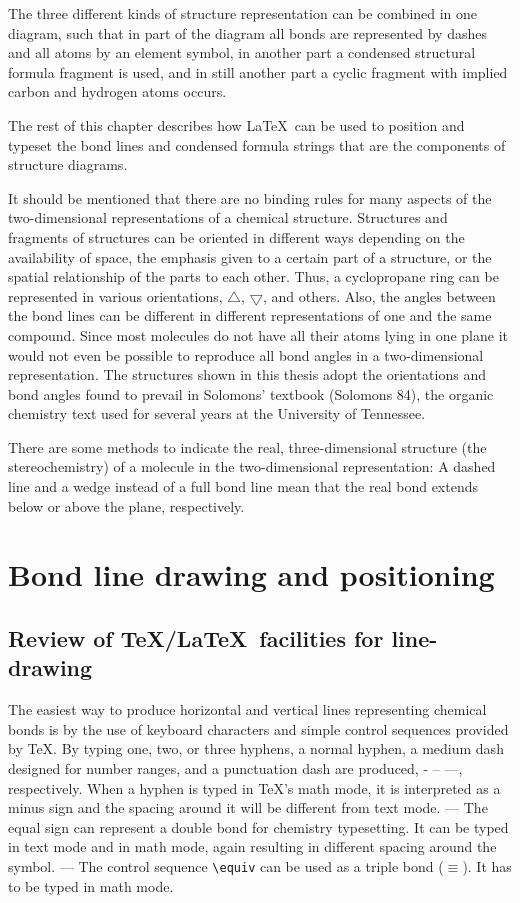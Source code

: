  \reinit
 The three different kinds of structure representation can
 be combined in one diagram, such that in part of the
 diagram all bonds are represented by dashes and all
 atoms by an element symbol, in another part a condensed
 structural formula fragment is used, and in still
 another part a cyclic fragment with implied carbon
 and hydrogen atoms occurs.
 
 The rest of this chapter describes how \LaTeX\  can be used
 to position and typeset the bond lines and condensed
 formula strings that are the components of structure
 diagrams.
 
 It should be mentioned that there are no binding rules
 for many aspects of the two-dimensional representations
 of a chemical structure. Structures and fragments of
 structures can be oriented in different ways depending
 on the availability of space, the emphasis given to
 a certain part of a structure, or the spatial
 relationship of the parts to each other.
 Thus, a cyclopropane ring can be represented in various
 orientations, $\bigtriangleup $, $\bigtriangledown $,
 and others. Also, the angles between
 the bond lines can be different in different representations
 of one and the same compound. Since most molecules do not
 have all their atoms lying in one plane it would not
 even be possible to reproduce all bond angles in a
 two-dimensional representation. The structures shown in
 this thesis adopt the orientations and bond angles
 found to prevail in Solomons' textbook (Solomons 84),
 the organic chemistry text used for several years at
 the University of Tennessee.
 
 There are some methods to indicate the real,
 three-dimensional structure (the stereochemistry)
 of a molecule in the two-dimensional representation:
 A dashed line and a wedge instead of a full bond
 line mean that the real bond extends below or
 above the plane, respectively.
 
\section{Bond line drawing and positioning}
\subsection{Review of \TeX/\LaTeX\  facilities for line-drawing}
\label{sc:review}
 The easiest way to produce horizontal and vertical lines representing
 chemical bonds is by the use of keyboard characters and simple control
 sequences provided by \TeX.  By typing one, two, or three hyphens,
 a normal hyphen, a medium dash designed for number ranges, and a
 punctuation dash are produced, - -- ---, respectively. When a hyphen
 is typed in \TeX's math mode, it is interpreted as a minus sign and
 the spacing around it will be different from text mode. ---
 The equal sign can represent a double bond for chemistry typesetting.
 It can be typed in text mode and in math mode, again resulting in
 different spacing around the symbol. --- The control sequence
 \verb+\equiv+ can be used as a triple bond ($\equiv $). It has to
 be typed in math mode.
 

